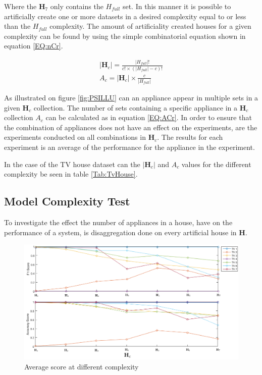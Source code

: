 Where the $\textbf{H}_7$ only contains the $H_{full}$ set. In this manner it is possible to artificially create one or more datasets in a desired complexity equal to or less than the $H_{full}$ complexity. The amount of artificiality created houses for a given complexity can be found by using the simple combinatorial equation shown in equation \ref{EQ:nCr}.

\begin{gather}
		|\textbf{H}_c| = \frac{|H_{full}|!}{c! \times (|H_{full}| - c)!} \label{EQ:nCr} \\
		A_c = |\textbf{H}_c| \times \frac{c}{|H_{full}|} \label{EQ:ACr}
\end{gather}


As illustrated on figure \ref{fig:PSILLU} can an appliance appear in multiple sets in a given $\textbf{H}_c$ collection. The number of sets containing a specific appliance in a $\textbf{H}_c$ collection $A_c$ can be calculated as in equation \ref{EQ:ACr}. In order to ensure that the combination of appliances does not have an effect on the experiments, are the experiments conducted on all combinations in $\textbf{H}_c$. The results for each experiment is an average of the performance for the appliance in the experiment. 



In the case of the TV house dataset can the $|\textbf{H}_c|$ and $A_c$ values for the different complexity be seen in table \ref{Tab:TvHouse}.


\subsection{Model Complexity Test}
\label{sec:MCT}
To investigate the effect the number of appliances in a house, have on the performance of a  system, is disaggregation done on every artificial house in $\textbf{H}$.

\begin{figure}[H]
\centering
\includegraphics[width=1\textwidth]{billeder/ModelSize.png}
\caption{Average score at different complexity }
\label{fig:COMPT}
\end{figure}

